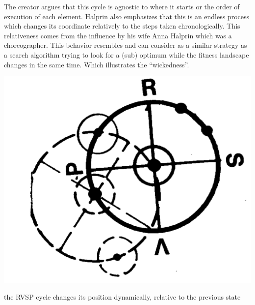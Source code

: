 The creator argues that this cycle is agnostic to where it starts or the
order of execution of each element. Halprin also emphasizes that this is an
endless process which changes its coordinate relatively to the steps taken
chronologically. This relativeness comes from the influence by his wife
Anna Halprin which was a choreographer. This behavior resembles and can
consider as a similar strategy as a search algorithm trying to look for a
(sub) optimum while the fitness landscape changes in the same time. Which
illustrates the “wickedness”.

\begin{marginfigure}
  \includegraphics[width=\textwidth]{chapters/3/fig/rvsp_relative.png}               
  \caption{the RVSP cycle changes its position dynamically, relative to
  the previous state \cite{halprin1969rsvp}}
  \label{fig:spin_margin}
\end{marginfigure}


